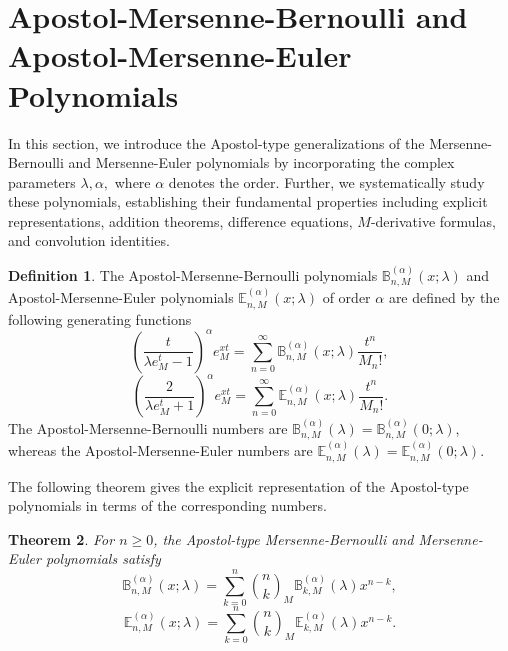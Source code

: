 \documentclass[12pt, a4paper]{article}
\newtheorem{theorem}{Theorem}[section]
\theoremstyle{definition}
\newtheorem{definition}[theorem]{Definition}
\numberwithin{equation}{section}
\newcommand{\B}{\mathbb{B}}
\newcommand{\E}{\mathbb{E}}
\begin{document}
\section{Apostol-Mersenne-Bernoulli and Apostol-Mersenne-Euler Polynomials}

In this section, we introduce the Apostol-type generalizations of the Mersenne-Bernoulli and Mersenne-Euler polynomials by incorporating the complex parameters $\lambda,\alpha,$ where $\alpha$ denotes the order. Further, we systematically study these polynomials, establishing their fundamental properties including explicit representations, addition theorems, difference equations, $M$-derivative formulas, and convolution identities. 

\begin{definition}
The Apostol-Mersenne-Bernoulli polynomials $\B_{n,M}^{(\alpha)}(x;\lambda)$ and Apostol-Mersenne-Euler polynomials $\E_{n,M}^{(\alpha)}(x;\lambda)$ of order $\alpha$ are defined by the following generating functions
\begin{equation}\label{eq:apostol-bm-def}
\left(\frac{t}{\lambda e_M^t-1}\right)^\alpha e_M^{xt} = \sum_{n=0}^\infty \B_{n,M}^{(\alpha)}(x;\lambda)\frac{t^n}{M_n!},
\end{equation}
\begin{equation}\label{eq:apostol-em-def}
\left(\frac{2}{\lambda e_M^t+1}\right)^\alpha e_M^{xt} = \sum_{n=0}^\infty \E_{n,M}^{(\alpha)}(x;\lambda)\frac{t^n}{M_n!}.
\end{equation}
The Apostol-Mersenne-Bernoulli numbers are $\B_{n,M}^{(\alpha)}(\lambda)=\B_{n,M}^{(\alpha)}(0;\lambda)$, whereas the Apostol-Mersenne-Euler numbers are $\E_{n,M}^{(\alpha)}(\lambda)=\E_{n,M}^{(\alpha)}(0;\lambda)$. 
\end{definition}

The following theorem gives the explicit representation of the Apostol-type polynomials in terms of the corresponding numbers.

\begin{theorem}\label{thm:explicit}
For $n\ge 0$, the Apostol-type Mersenne-Bernoulli and Mersenne-Euler polynomials satisfy
\begin{equation}\label{eq:apostol-bm-explicit}
\B_{n,M}^{(\alpha)}(x;\lambda) = \sum_{k=0}^n \binom{n}{k}_M \B_{k,M}^{(\alpha)}(\lambda) x^{n-k},
\end{equation}
\begin{equation}\label{eq:apostol-em-explicit}
\E_{n,M}^{(\alpha)}(x;\lambda) = \sum_{k=0}^n \binom{n}{k}_M \E_{k,M}^{(\alpha)}(\lambda) x^{n-k}.
\end{equation}
\end{theorem}
\end{document}
